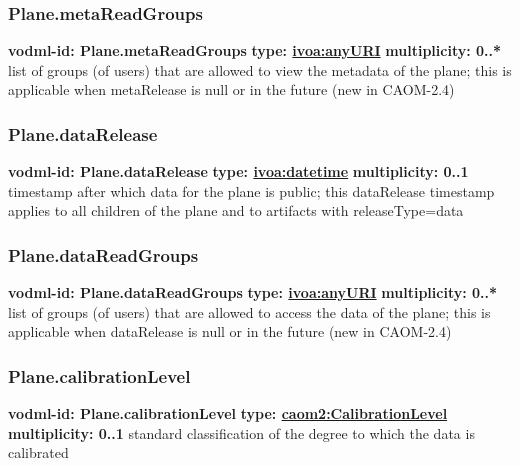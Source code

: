     \subsubsection{Plane.metaReadGroups}
      \textbf{vodml-id: Plane.metaReadGroups} \newline
      \textbf{type: \hyperref[sect:ivoa]{ivoa:anyURI}} \newline
      \textbf{multiplicity: 0..*} \newline
      list of groups (of users) that are allowed to view the metadata of the plane; this is applicable when metaRelease is null or in the future (new in CAOM-2.4)

    \subsubsection{Plane.dataRelease}
      \textbf{vodml-id: Plane.dataRelease} \newline
      \textbf{type: \hyperref[sect:ivoa]{ivoa:datetime}} \newline
      \textbf{multiplicity: 0..1} \newline
      timestamp after which data for the plane is public; this dataRelease timestamp applies to all children of the plane and to artifacts with releaseType=data

    \subsubsection{Plane.dataReadGroups}
      \textbf{vodml-id: Plane.dataReadGroups} \newline
      \textbf{type: \hyperref[sect:ivoa]{ivoa:anyURI}} \newline
      \textbf{multiplicity: 0..*} \newline
      list of groups (of users) that are allowed to access the data of the plane; this is applicable when dataRelease is null or in the future (new in CAOM-2.4)

    \subsubsection{Plane.calibrationLevel}
      \textbf{vodml-id: Plane.calibrationLevel} \newline
      \textbf{type: \hyperref[sect:CalibrationLevel]{caom2:CalibrationLevel}} \newline
      \textbf{multiplicity: 0..1} \newline
      standard classification of the degree to which the data is calibrated

